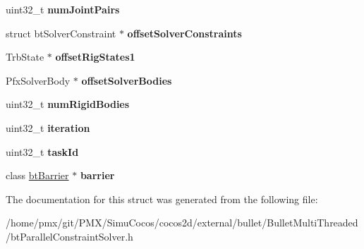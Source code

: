 \begin{DoxyCompactItemize}
\item 
\mbox{\label{structPfxSolveConstraintsIO_aaa624ef1b0462bcb766f47a454580407}} 
uint32\+\_\+t {\bfseries num\+Joint\+Pairs}
\item 
\mbox{\label{structPfxSolveConstraintsIO_a7ac79e98ffed27251ed1bc1021563919}} 
struct bt\+Solver\+Constraint $\ast$ {\bfseries offset\+Solver\+Constraints}
\item 
\mbox{\label{structPfxSolveConstraintsIO_a4319a62cb884ac73dd34504246fa896d}} 
Trb\+State $\ast$ {\bfseries offset\+Rig\+States1}
\item 
\mbox{\label{structPfxSolveConstraintsIO_a9ef98c374742a8f1470300e8b3655cce}} 
Pfx\+Solver\+Body $\ast$ {\bfseries offset\+Solver\+Bodies}
\item 
\mbox{\label{structPfxSolveConstraintsIO_afff263aaa89e8f6abe3fb34019954541}} 
uint32\+\_\+t {\bfseries num\+Rigid\+Bodies}
\item 
\mbox{\label{structPfxSolveConstraintsIO_aa21b9ac19393abe12574d8490322f06f}} 
uint32\+\_\+t {\bfseries iteration}
\item 
\mbox{\label{structPfxSolveConstraintsIO_ade0f4570184210bb96d83ba2254b91d6}} 
uint32\+\_\+t {\bfseries task\+Id}
\item 
\mbox{\label{structPfxSolveConstraintsIO_a76f4d2a0e06f3601b4dd550da11339b9}} 
class \hyperlink{classbtBarrier}{bt\+Barrier} $\ast$ {\bfseries barrier}
\end{DoxyCompactItemize}


The documentation for this struct was generated from the following file\+:\begin{DoxyCompactItemize}
\item 
/home/pmx/git/\+P\+M\+X/\+Simu\+Cocos/cocos2d/external/bullet/\+Bullet\+Multi\+Threaded/bt\+Parallel\+Constraint\+Solver.\+h\end{DoxyCompactItemize}
